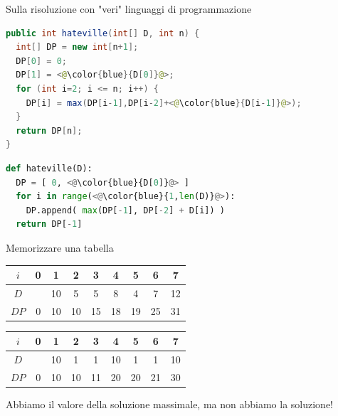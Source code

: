 \begin{frame}[fragile]{Sulla risoluzione con "veri" linguaggi di programmazione}

\begin{lstlisting}[language=java]
public int hateville(int[] D, int n) {
  int[] DP = new int[n+1];
  DP[0] = 0;
  DP[1] = <@\color{blue}{D[0]}@>;
  for (int i=2; i <= n; i++) {
    DP[i] = max(DP[i-1],DP[i-2]+<@\color{blue}{D[i-1]}@>);
  }
  return DP[n];
}
\end{lstlisting}

\begin{lstlisting}[language=python]
def hateville(D):
  DP = [ 0, <@\color{blue}{D[0]}@> ]
  for i in range(<@\color{blue}{1,len(D)}@>):
    DP.append( max(DP[-1], DP[-2] + D[i]) )
  return DP[-1]
\end{lstlisting}


\end{frame}



\begin{frame}{Memorizzare una tabella}

\begin{center}
\medskip
\begin{tabular}{|c|c|c|c|c|c|c|c|c|}
\hline
$i$ & 0 & 1 & 2 & 3 & 4 & 5 & 6 & 7 \\\hline
$D$ &   & 10 & 5 & 5 & 8 & 4 & 7 & 12 \\\hline
$DP$ & 0 & 10 & 10 & 15 & 18 & 19 & 25 & 31 \\\hline
\end{tabular}

\medskip
\begin{tabular}{|c|c|c|c|c|c|c|c|c|}
\hline
$i$ & 0 & 1 & 2 & 3 & 4 & 5 & 6 & 7 \\\hline
$D$ &   & 10 & 1 & 1 & 10 & 1 & 1 & 10 \\\hline
$DP$ & 0 & 10 & 10 & 11 & 20 & 20 & 21 & 30 \\\hline
\end{tabular}
\end{center}

\BIL
\item Abbiamo il valore della soluzione massimale, ma non abbiamo
la soluzione!
\EIL

\end{frame}

